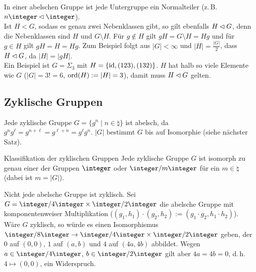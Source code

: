 \begin{Bsp}
    In einer abelschen Gruppe ist jede Untergruppe ein Normalteiler
    (z.\,B. $n\integer \nt \integer$).\\
    Ist $H < G$, sodass es genau zwei Nebenklassen gibt, so gilt ebenfalls
    $H \mathbin{\vartriangleleft} G$, denn die Nebenklassen sind $H$ und $G \setminus H$.
    Für $g \notin H$ gilt $gH = G \setminus H = Hg$ und
    für $g \in H$ gilt $gH = H = Hg$.
    Zum Beispiel folgt aus $|G| < \infty$ und $|H| = \frac{|G|}{2}$, dass
    $H \mathbin{\vartriangleleft} G$, da $|H| = |gH|$.\\
    Ein Beispiel ist $G = \Sigma_3$ mit $H = \{\operatorname{id}, (123), (132)\}$.
    $H$ hat halb so viele Elemente wie $G$ ($|G| = 3! = 6$,
    $\operatorname{ord}(H) := |H| = 3$), damit muss $H \mathbin{\vartriangleleft} G$ gelten.
\end{Bsp}

\pagebreak

\subsection{%
    Zyklische Gruppen%
}

\begin{Bem}
    Jede zyklische Gruppe $G = \{g^n \;|\; n \in \natural\}$
    ist abelsch, da\\
    $g^n g^\ell = g^{n+\ell} = g^{\ell+n} = g^\ell g^n$.
    $|G|$ bestimmt $G$ bis auf Isomorphie (siehe nächster Satz).
\end{Bem}

\begin{Satz}{Klassifikation der zyklischen Gruppen}
    Jede zyklische Gruppe $G$ ist isomorph zu genau einer der Gruppen
    $\integer$ oder $\integer/m\integer$ für ein $m \in \natural$
    (dabei ist $m = |G|$).
\end{Satz}

\begin{Bsp}
    Nicht jede abelsche Gruppe ist zyklisch.
    Sei $G = \integer/4\integer \times \integer/2\integer$
    die abelsche Gruppe mit komponentenweiser Multiplikation
    ($(g_1, h_1) \cdot (g_2, h_2) := (g_1 \cdot g_2, h_1 \cdot h_2)$).
    Wäre $G$ zyklisch, so würde es einen Isomorphismus
    $\integer/8\integer \rightarrow \integer/4\integer \times
    \integer/2\integer$ geben, der $0$ auf $(0, 0)$,
    $1$ auf $(a, b)$ und $4$ auf $(4a, 4b)$ abbildet.
    Wegen $a \in \integer/4\integer$, $b \in \integer/2\integer$ gilt
    aber $4a = 4b = 0$, d.\,h. $4 \mapsto (0, 0)$, ein Widerspruch.
\end{Bsp}

